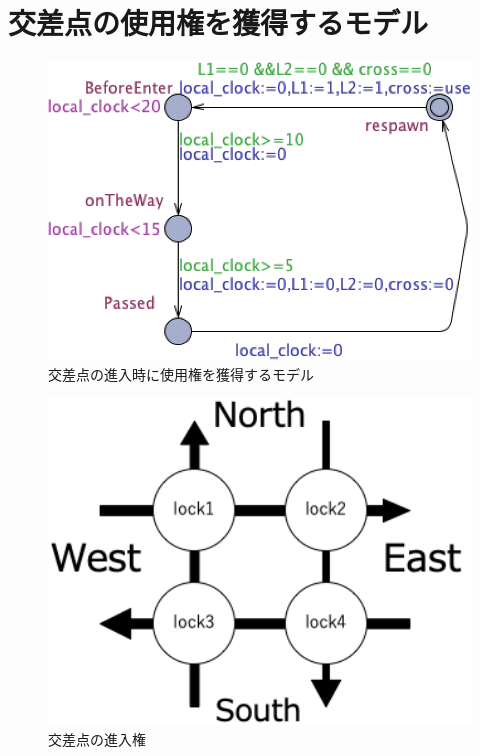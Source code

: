 \documentclass{tpu-sotu}
\begin{document}
	\section{交差点の使用権を獲得するモデル}
	\begin{figure}[htbp]
	\centering
	\includegraphics[width=140mm]{SimpleIntersection.png}
	\caption{交差点の進入時に使用権を獲得するモデル}
	\label{SI}
	\end{figure}
	\begin{figure}[htbp]
	\centering
	\includegraphics[width=130mm]{onTheWayofLock.png}
	\caption{交差点の進入権}
	\label{oTWoL}
	\end{figure}
\end{document}
